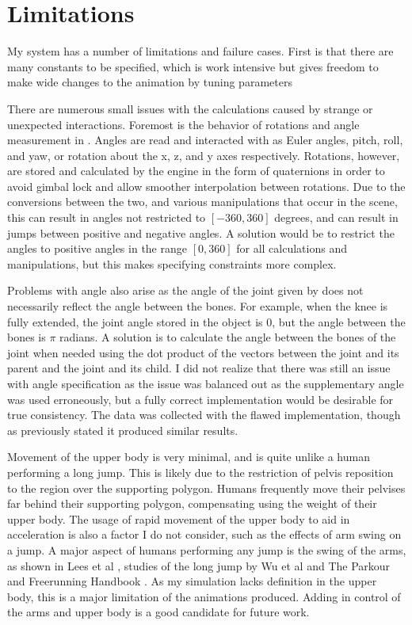 

\section{Limitations}
\label{section:limitations}
My system has a number of limitations and failure cases.  First is that there are many constants to be specified, which is work intensive but gives freedom to make wide changes to the animation by tuning parameters

There are numerous small issues with the calculations caused by strange or unexpected interactions.  Foremost is the behavior of rotations and angle measurement in \unity{}.  Angles are read and interacted with as Euler angles, pitch, roll, and yaw, or rotation about the x, z, and y axes respectively.  Rotations, however, are stored and calculated by the engine in the form of quaternions in order to avoid gimbal lock and allow smoother interpolation between rotations.  Due to the conversions between the two, and various manipulations that occur in the scene, this can result in angles not restricted to $[-360, 360]$ degrees, and can result in jumps between positive and negative angles.  A solution would be to restrict the angles to positive angles in the range $[0,360]$ for all calculations and manipulations, but this makes specifying constraints more complex.  

Problems with angle also arise as the angle of the joint given by \unity{} does not necessarily reflect the angle between the bones.  For example, when the knee is fully extended, the joint angle stored in the object is 0, but the angle between the bones is $\pi$ radians.  A solution is to calculate the angle between the bones of the joint when needed using the dot product of the vectors between the joint and its parent and the joint and its child.  I did not realize that there was still an issue with angle specification as the issue was balanced out as the supplementary angle was used erroneously, but a fully correct implementation would be desirable for true consistency.  The data was collected with the flawed implementation, though as previously stated it produced similar results.

Movement of the upper body is very minimal, and is quite unlike a human performing a long jump.  This is likely due to the restriction of pelvis reposition to the region over the supporting polygon.  Humans frequently move their pelvises far behind their supporting polygon, compensating using the weight of their upper body.  The usage of rapid movement of the upper body to aid in acceleration is also a factor I do not consider, such as the effects of arm swing on a jump.  A major aspect of humans performing any jump is the swing of the arms, as shown in Lees et al \cite{lees_arm_swing}, studies of the long jump by Wu et al \cite{longjump} and The Parkour and Freerunning Handbook \cite{parkour}.  As my simulation lacks definition in the upper body, this is a major limitation of the animations produced.  Adding in control of the arms and upper body is a good candidate for future work.

